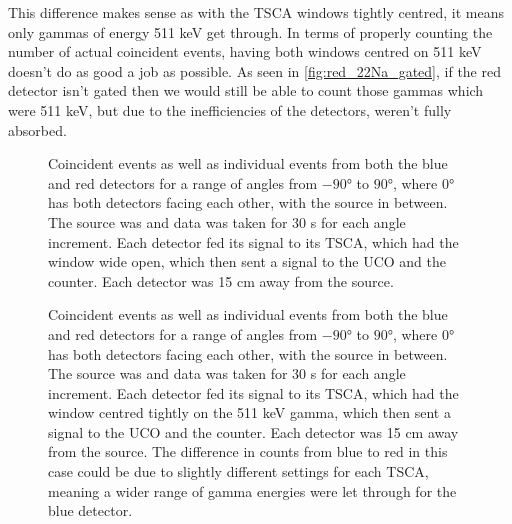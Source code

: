 \documentclass[11pt]{article}
\numberwithin{equation}{section}
\numberwithin{figure}{section}
\numberwithin{table}{section}
\begin{document}
\par This difference makes sense as with the TSCA windows tightly centred, it means only gammas of energy 511 keV get through. In terms of properly counting the number of actual coincident events, having both windows centred on 511 keV doesn't do as good a job as possible. As seen in \cref{fig:red_22Na_gated}, if the red detector isn't gated then we would still be able to count those gammas which were 511 keV, but due to the inefficiencies of the detectors, weren't fully absorbed. 

\begin{figure}
    \begin{center}
       \caption{Coincident events as well as individual events from both the blue and red detectors for a range of angles from $\ang{-90}$ to $\ang{90}$, where $\ang{0}$ has both detectors facing each other, with the source in between. The source was  and data was taken for 30 s for each angle increment. Each detector fed its signal to its TSCA, which had the window wide open, which then sent a signal to the UCO and the counter. Each detector was 15 cm away from the source.}
       \label{fig:angular_1}
    \end{center}
\end{figure}

\begin{figure}
    \begin{center}
       \caption{Coincident events as well as individual events from both the blue and red detectors for a range of angles from $\ang{-90}$ to $\ang{90}$, where $\ang{0}$ has both detectors facing each other, with the source in between. The source was  and data was taken for 30 s for each angle increment. Each detector fed its signal to its TSCA, which had the window centred tightly on the 511 keV gamma, which then sent a signal to the UCO and the counter. Each detector was 15 cm away from the source. The difference in counts from blue to red in this case could be due to slightly different settings for each TSCA, meaning a wider range of gamma energies were let through for the blue detector.}
       \label{fig:angular_2}
    \end{center}
\end{figure}
\end{document}
